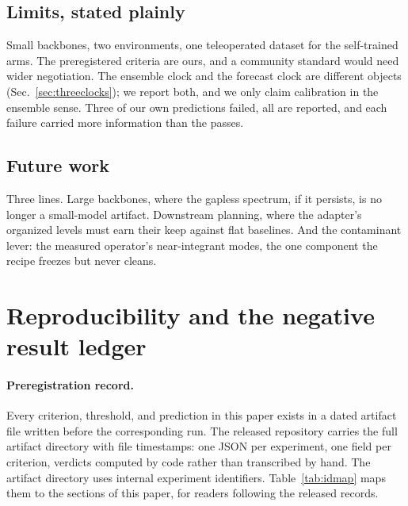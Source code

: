 \documentclass[11pt]{article}
\begin{document}
\subsection{Limits, stated plainly}

Small backbones, two environments, one teleoperated dataset for the self-trained arms.
The preregistered criteria are ours, and a community standard would need wider negotiation.
The ensemble clock and the forecast clock are different objects (Sec.~\ref{sec:threeclocks}); we report both, and we only claim calibration in the ensemble sense.
Three of our own predictions failed, all are reported, and each failure carried more information than the passes.

\subsection{Future work}

Three lines.
Large backbones, where the gapless spectrum, if it persists, is no longer a small-model artifact.
Downstream planning, where the adapter's organized levels must earn their keep against flat baselines.
And the contaminant lever: the measured operator's near-integrant modes, the one component the recipe freezes but never cleans.




\appendix

\section{Reproducibility and the negative result ledger}
\label{app:ledger}

\paragraph{Preregistration record.}
Every criterion, threshold, and prediction in this paper exists in a dated artifact file written before the corresponding run.
The released repository carries the full artifact directory with file timestamps: one JSON per experiment, one field per criterion, verdicts computed by code rather than transcribed by hand.
The artifact directory uses internal experiment identifiers.
Table~\ref{tab:idmap} maps them to the sections of this paper, for readers following the released records.
\end{document}
